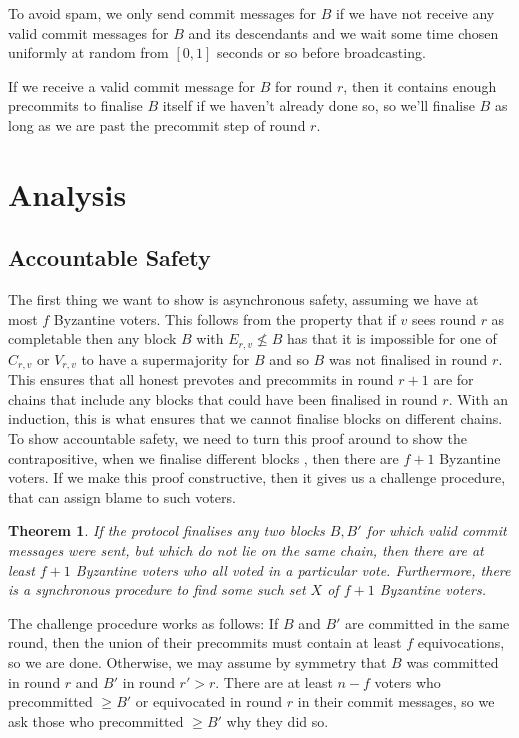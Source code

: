 \documentclass{article}
\newtheorem{theorem}{Theorem}[section]
\begin{document}
To avoid spam, we only send commit messages for $B$ if we have not receive any valid commit messages for $B$ and its descendants and we wait some time chosen uniformly at random from $[0,1]$ seconds or so before broadcasting.

If we receive a valid commit message for $B$ for round $r$, then it contains enough precommits to finalise $B$ itself if we haven't already done so, so we'll finalise $B$ as long as we are past the precommit step of round $r$.

\section{ Analysis }

\subsection{ Accountable Safety}

The first thing we want to show is asynchronous safety, assuming we have at most $f$ Byzantine voters. This follows from the property that if $v$ sees round $r$ as completable then any block $B$ with $E_{r,v} \not\leq B$ has that it is impossible for one of $C_{r,v}$ or $V_{r,v}$ to have a supermajority for $B$ and so $B$ was not finalised in round $r$. This ensures that all honest prevotes and precommits in round $r+1$ are for chains that include any blocks that could have been finalised in round $r$. With an induction, this is what ensures that we cannot finalise blocks on different chains. To show accountable safety, we need to turn this proof around to show the contrapositive, when we finalise different blocks , then there are $f+1$ Byzantine voters. If we make this proof constructive, then it gives us a challenge procedure, that can assign blame to such voters.

\begin{theorem} \label{thm:accountable} If the protocol finalises any two blocks $B,B'$ for which valid commit messages were sent, but which do not lie on the same chain, then there are at least $f+1$ Byzantine voters who all voted in a particular vote. Furthermore, there is a synchronous procedure to find some such set $X$ of $f+1$ Byzantine voters.
\end{theorem}

The challenge procedure works as follows: If $B$ and $B'$ are committed in the same round, then the union of their precommits must contain at least $f$ equivocations, so we are done.  Otherwise, we may assume by symmetry that $B$ was committed in round $r$ and $B'$ in round $r' > r$.  There are at least $n-f$ voters who precommitted $\geq B'$ or equivocated in round $r$ in their commit messages, so we ask those who precommitted $\geq B'$ why they did so.
\end{document}
